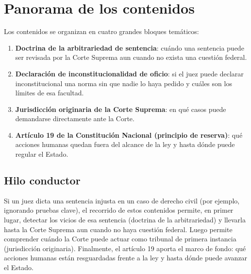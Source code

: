 \documentclass[12pt,oneside]{book}
\begin{document}
\tableofcontents

\mainmatter


\chapter{Panorama de los contenidos}

Los contenidos se organizan en cuatro grandes bloques temáticos:

\begin{enumerate}
    \item \textbf{Doctrina de la arbitrariedad de sentencia}: cuándo una sentencia puede ser revisada por la Corte Suprema aun cuando no exista una cuestión federal.
    \item \textbf{Declaración de inconstitucionalidad de oficio}: si el juez puede declarar inconstitucional una norma sin que nadie lo haya pedido y cuáles son los límites de esa facultad.
    \item \textbf{Jurisdicción originaria de la Corte Suprema}: en qué casos puede demandarse directamente ante la Corte.
    \item \textbf{Artículo 19 de la Constitución Nacional (principio de reserva)}: qué acciones humanas quedan fuera del alcance de la ley y hasta dónde puede regular el Estado.
\end{enumerate}

\section{Hilo conductor}

Si un juez dicta una sentencia injusta en un caso de derecho civil (por ejemplo, ignorando pruebas clave), el recorrido de estos contenidos permite, en primer lugar, detectar los vicios de esa sentencia (doctrina de la arbitrariedad) y llevarla hasta la Corte Suprema aun cuando no haya cuestión federal. Luego permite comprender cuándo la Corte puede actuar como tribunal de primera instancia (jurisdicción originaria). Finalmente, el artículo 19 aporta el marco de fondo: qué acciones humanas están resguardadas frente a la ley y hasta dónde puede avanzar el Estado.
\end{document}
